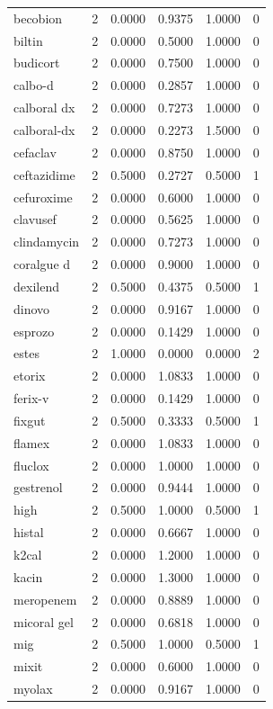 \begin{longtable}{p{3.0cm}rrrrr}
becobion & 2 & 0.0000 & 0.9375 & 1.0000 & 0 \\
biltin & 2 & 0.0000 & 0.5000 & 1.0000 & 0 \\
budicort & 2 & 0.0000 & 0.7500 & 1.0000 & 0 \\
calbo-d & 2 & 0.0000 & 0.2857 & 1.0000 & 0 \\
calboral dx & 2 & 0.0000 & 0.7273 & 1.0000 & 0 \\
calboral-dx & 2 & 0.0000 & 0.2273 & 1.5000 & 0 \\
cefaclav & 2 & 0.0000 & 0.8750 & 1.0000 & 0 \\
ceftazidime & 2 & 0.5000 & 0.2727 & 0.5000 & 1 \\
cefuroxime & 2 & 0.0000 & 0.6000 & 1.0000 & 0 \\
clavusef & 2 & 0.0000 & 0.5625 & 1.0000 & 0 \\
clindamycin & 2 & 0.0000 & 0.7273 & 1.0000 & 0 \\
coralgue d & 2 & 0.0000 & 0.9000 & 1.0000 & 0 \\
dexilend & 2 & 0.5000 & 0.4375 & 0.5000 & 1 \\
dinovo & 2 & 0.0000 & 0.9167 & 1.0000 & 0 \\
esprozo & 2 & 0.0000 & 0.1429 & 1.0000 & 0 \\
estes & 2 & 1.0000 & 0.0000 & 0.0000 & 2 \\
etorix & 2 & 0.0000 & 1.0833 & 1.0000 & 0 \\
ferix-v & 2 & 0.0000 & 0.1429 & 1.0000 & 0 \\
fixgut & 2 & 0.5000 & 0.3333 & 0.5000 & 1 \\
flamex & 2 & 0.0000 & 1.0833 & 1.0000 & 0 \\
fluclox & 2 & 0.0000 & 1.0000 & 1.0000 & 0 \\
gestrenol & 2 & 0.0000 & 0.9444 & 1.0000 & 0 \\
high & 2 & 0.5000 & 1.0000 & 0.5000 & 1 \\
histal & 2 & 0.0000 & 0.6667 & 1.0000 & 0 \\
k2cal & 2 & 0.0000 & 1.2000 & 1.0000 & 0 \\
kacin & 2 & 0.0000 & 1.3000 & 1.0000 & 0 \\
meropenem & 2 & 0.0000 & 0.8889 & 1.0000 & 0 \\
micoral gel & 2 & 0.0000 & 0.6818 & 1.0000 & 0 \\
mig & 2 & 0.5000 & 1.0000 & 0.5000 & 1 \\
mixit & 2 & 0.0000 & 0.6000 & 1.0000 & 0 \\
myolax & 2 & 0.0000 & 0.9167 & 1.0000 & 0 \\

\end{longtable}
